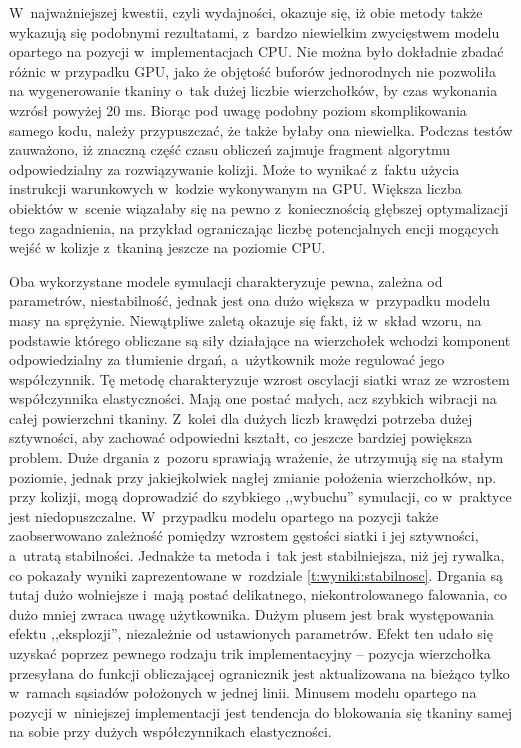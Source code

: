 	W~najważniejszej kwestii, czyli wydajności, okazuje się, iż obie metody także wykazują się podobnymi rezultatami, z~bardzo niewielkim zwycięstwem modelu opartego na pozycji w~implementacjach CPU. Nie można było dokładnie zbadać różnic w przypadku GPU, jako że objętość buforów jednorodnych nie pozwoliła na wygenerowanie tkaniny o~tak dużej liczbie wierzchołków, by czas wykonania wzrósł powyżej 20 ms. Biorąc pod uwagę podobny poziom skomplikowania samego kodu, należy przypuszczać, że także byłaby ona niewielka. Podczas testów zauważono, iż znaczną część czasu obliczeń zajmuje fragment algorytmu odpowiedzialny za rozwiązywanie kolizji. Może to wynikać z~faktu użycia instrukcji warunkowych w~kodzie wykonywanym na GPU. Większa liczba obiektów w~scenie wiązałaby się na pewno z~koniecznością głębszej optymalizacji tego zagadnienia, na przykład ograniczając liczbę potencjalnych encji mogących wejść w kolizje z~tkaniną jeszcze na poziomie CPU.
	
	Oba wykorzystane modele symulacji charakteryzuje pewna, zależna od parametrów, niestabilność, jednak jest ona dużo większa w~przypadku modelu masy na sprężynie. Niewątpliwe zaletą okazuje się fakt, iż w~skład wzoru, na podstawie którego obliczane są siły działające na wierzchołek wchodzi komponent odpowiedzialny za tłumienie drgań, a~użytkownik może regulować jego współczynnik. Tę metodę charakteryzuje wzrost oscylacji siatki wraz ze wzrostem współczynnika elastyczności. Mają one postać małych, acz szybkich wibracji na całej powierzchni tkaniny. Z~kolei dla dużych liczb krawędzi potrzeba dużej sztywności, aby zachować odpowiedni kształt, co jeszcze bardziej powiększa problem. Duże drgania z~pozoru sprawiają wrażenie, że utrzymują się na stałym poziomie, jednak przy jakiejkolwiek nagłej zmianie położenia wierzchołków, np. przy kolizji, mogą doprowadzić do szybkiego ,,wybuchu'' symulacji, co w~praktyce jest niedopuszczalne. W~przypadku modelu opartego na pozycji także zaobserwowano zależność pomiędzy wzrostem gęstości siatki i jej sztywności, a~utratą stabilności. Jednakże ta metoda i~tak jest stabilniejsza, niż jej rywalka, co pokazały wyniki zaprezentowane w~rozdziale \ref{t:wyniki:stabilnosc}. Drgania są tutaj dużo wolniejsze i~mają postać delikatnego, niekontrolowanego falowania, co dużo mniej zwraca uwagę użytkownika. Dużym plusem jest brak występowania efektu ,,eksplozji'', niezależnie od ustawionych parametrów. Efekt ten udało się uzyskać poprzez pewnego rodzaju trik implementacyjny -- pozycja wierzchołka przesyłana do funkcji obliczającej ogranicznik jest aktualizowana na bieżąco tylko w~ramach sąsiadów położonych w jednej linii. Minusem modelu opartego na pozycji w~niniejszej implementacji jest tendencja do blokowania się tkaniny samej na sobie przy dużych współczynnikach elastyczności.
	
